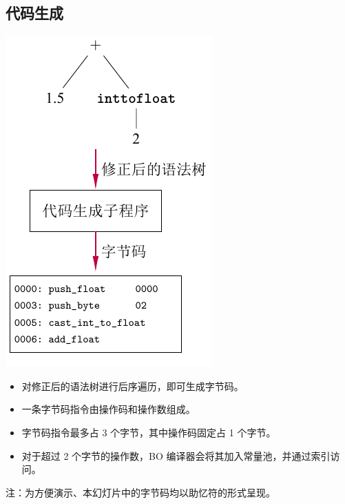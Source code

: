 \documentclass[dvipsnames, svgnames, x11names]{beamer}
\begin{document}
\subsection{代码生成}
\begin{frame}
    \begin{minipage}{.4\linewidth}
    \includegraphics[width=\linewidth]{../figure/generator.pdf}
    \end{minipage}
    \quad
    \begin{minipage}{.55\linewidth}
    \begin{itemize}[<+->]
        \item 对修正后的语法树进行后序遍历，即可生成字节码。
        \item 一条\alert{字节码指令}由操作码和操作数组成。
        \item 字节码指令最多占 3 个字节，其中操作码固定占 1 个字节。
        \item 对于超过 2 个字节的操作数，BO 编译器会将其加入\alert{常量池}，并通过索引访问。
    \end{itemize}
    \onslide<+->注：为方便演示、本幻灯片中的字节码均以\alert{助忆符}的形式呈现。
    \end{minipage}
\end{frame}
\end{document}
